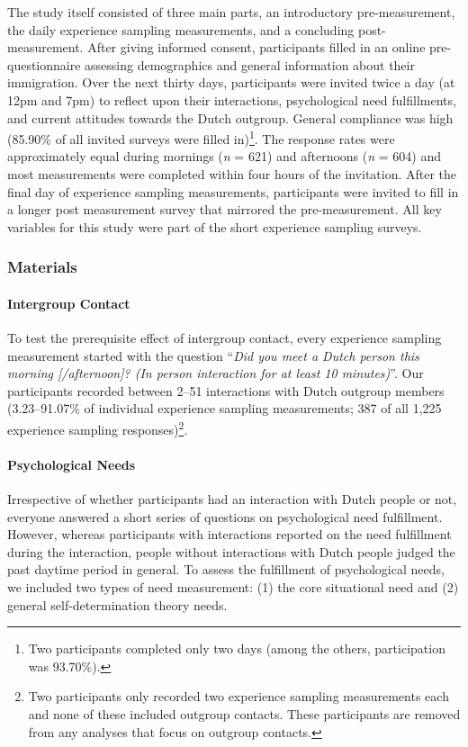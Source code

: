 \documentclass[man, 12pt, a4paper, mask]{apa7}
\theoremstyle{break}
\theoremstyle{plain}
\begin{document}
The study itself consisted of three main parts, an introductory
pre-measurement, the daily experience sampling measurements, and a
concluding post-measurement. After giving informed consent, participants
filled in an online pre-questionnaire assessing demographics and general
information about their immigration. Over the next thirty days,
participants were invited twice a day (at 12pm and 7pm) to reflect upon
their interactions, psychological need fulfillments, and current
attitudes towards the Dutch outgroup. General compliance was high
(85.90\% of all invited surveys were filled
in)\footnote{Two participants completed only two days (among the others, participation was 93.70\%).}.
The response rates were approximately equal during mornings (\textit{n}
= 621) and afternoons (\textit{n} = 604) and most measurements were
completed within four hours of the invitation. After the final day of
experience sampling measurements, participants were invited to fill in a
longer post measurement survey that mirrored the pre-measurement. All
key variables for this study were part of the short experience sampling
surveys.

\subsubsection{Materials}

\paragraph{Intergroup Contact}

To test the prerequisite effect of intergroup contact, every experience
sampling measurement started with the question
``\textit{Did you meet a Dutch person this morning [/afternoon]? (In person interaction for at least 10 minutes)}''.
Our participants recorded between 2--51 interactions with Dutch outgroup
members (3.23--91.07\% of individual experience sampling measurements;
387 of all 1,225 experience sampling
responses)\footnote{Two participants only recorded two experience sampling measurements each and none of these included outgroup contacts. These participants are removed from any analyses that focus on outgroup contacts.}.

\paragraph{Psychological Needs}

Irrespective of whether participants had an interaction with Dutch
people or not, everyone answered a short series of questions on
psychological need fulfillment. However, whereas participants with
interactions reported on the need fulfillment during the interaction,
people without interactions with Dutch people judged the past daytime
period in general. To assess the fulfillment of psychological needs, we
included two types of need measurement: (1) the core situational need
and (2) general self-determination theory needs.
\end{document}
